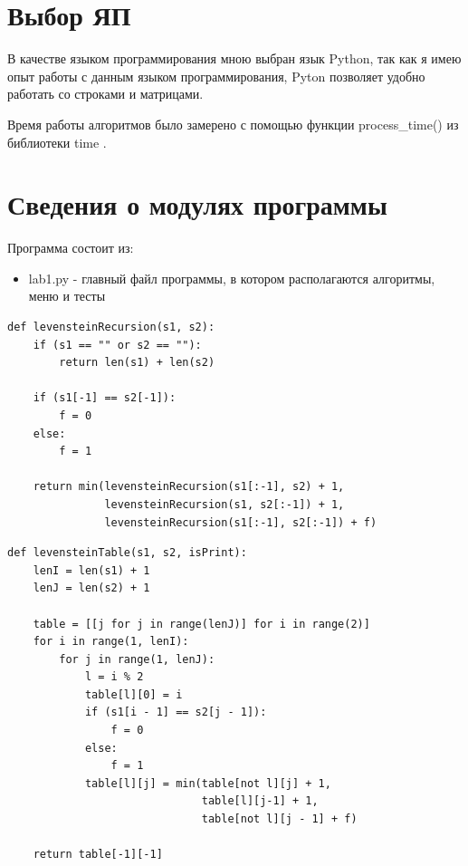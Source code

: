 \documentclass[12pt]{report}
\begin{document}
\section{Выбор ЯП}
В качестве языком программирования мною выбран язык Python, так как я имею опыт работы с данным языком программирования, Pyton позволяет удобно работать со строками и матрицами.

Время работы алгоритмов было замерено с помощью функции process\_time() из библиотеки time \cite{lit}.

\section{Сведения о модулях программы}
Программа состоит из:
\begin{itemize}
	\item lab1.py - главный файл программы, в котором располагаются алгоритмы, меню и тесты
\end{itemize}

\begin{lstlisting}[label=some-code,caption=Функция нахождения расстояния Левенштейна рекурсивно]
def levensteinRecursion(s1, s2):
    if (s1 == "" or s2 == ""):
        return len(s1) + len(s2)

    if (s1[-1] == s2[-1]): 
        f = 0 
    else: 
        f = 1

    return min(levensteinRecursion(s1[:-1], s2) + 1,
               levensteinRecursion(s1, s2[:-1]) + 1,
               levensteinRecursion(s1[:-1], s2[:-1]) + f)
\end{lstlisting}

\begin{lstlisting}[label=some-code,caption=Функция нахождения расстояния Левенштейна с кешом в 2 строки]
def levensteinTable(s1, s2, isPrint):
    lenI = len(s1) + 1
    lenJ = len(s2) + 1

    table = [[j for j in range(lenJ)] for i in range(2)]
    for i in range(1, lenI):
        for j in range(1, lenJ):
            l = i % 2
            table[l][0] = i
            if (s1[i - 1] == s2[j - 1]):
                f = 0 
            else:
                f = 1
            table[l][j] = min(table[not l][j] + 1,
                              table[l][j-1] + 1,
                              table[not l][j - 1] + f)
            
    return table[-1][-1]
\end{lstlisting}
\end{document}
